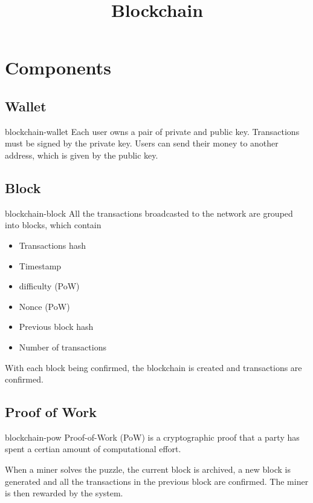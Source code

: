 \documentclass[preview]{standalone}
\begin{document}
\title{Blockchain}
\genpage

\section{Components}

\subsection{Wallet}

\begin{snippet}{blockchain-wallet}
Each user owns a pair of private and public key.
Transactions must be signed by the private key. Users
can send their money to another address, which is given by the public key.
\end{snippet}

\subsection{Block}

\begin{snippet}{blockchain-block}
All the transactions broadcasted to the network are grouped into blocks, which contain

\begin{itemize}
    \item Transactions hash
    \item Timestamp
    \item difficulty (PoW)
    \item Nonce (PoW)
    \item Previous block hash
    \item Number of transactions
\end{itemize}

With each block being confirmed, the blockchain is created
and transactions are confirmed.
\end{snippet}

\subsection{Proof of Work}

\begin{snippet}{blockchain-pow}
Proof-of-Work (PoW) is a cryptographic proof that a party has spent
a certian amount of computational effort.

When a miner solves the puzzle, the current block is archived, a new
block is generated and all the transactions in the previous block are confirmed.
The miner is then rewarded by the system.
\end{snippet}
\end{document}
